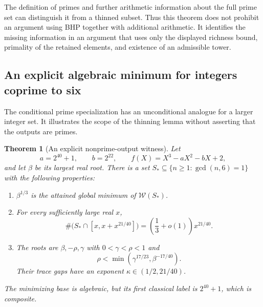 \documentclass[11pt,a4paper]{article}
\newtheorem{theorem}{Theorem}[section]
\theoremstyle{definition}\newtheorem{definition}[theorem]{Definition}
\theoremstyle{remark}\newtheorem{remark}[theorem]{Remark}
\begin{document}
The definition of primes and further arithmetic information about
the full prime set can distinguish it from a thinned subset. Thus
this theorem does not prohibit an argument using BHP together with
additional arithmetic. It identifies the missing information in an
argument that uses only the displayed richness bound, primality of
the retained elements, and existence of an admissible tower.

\subsection{An explicit algebraic minimum for integers coprime to six}

The conditional prime specialization has an unconditional analogue
for a larger integer set. It illustrates the scope of the thinning
lemma without asserting that the outputs are primes.

\begin{theorem}[An explicit nonprime-output witness]\label{R14:thm:wheel}
Let
\begin{equation}\label{R14:eq:wheel-poly}
 a=2^{40}+1,\qquad b=2^{22},\qquad
 f(X)=X^3-aX^2-bX+2,
\end{equation}
and let $\beta$ be its largest real root. There is a set
$S_\ast\subseteq\{n\ge1:\gcd(n,6)=1\}$ with the following
properties:
\begin{enumerate}[label=\textup{(\roman*)}]
 \item $\beta^{1/3}$ is the attained global minimum of
       $\mathcal W(S_\ast)$.
 \item For every sufficiently large real $x$,
       \[
       \#\bigl(S_\ast\cap[x,x+x^{21/40}]\bigr)
       =\left(\frac13+o(1)\right)x^{21/40}.
       \]
 \item The roots are $\beta,-\rho,\gamma$ with
       $0<\gamma<\rho<1$ and
       \[
       \rho<\min(\gamma^{17/23},\beta^{-17/40}).
       \]
       Their trace gaps have an exponent
       $\kappa\in(1/2,21/40)$.
\end{enumerate}
The minimizing base is algebraic, but its first classical label is
$2^{40}+1$, which is composite.
\end{theorem}
\end{document}
